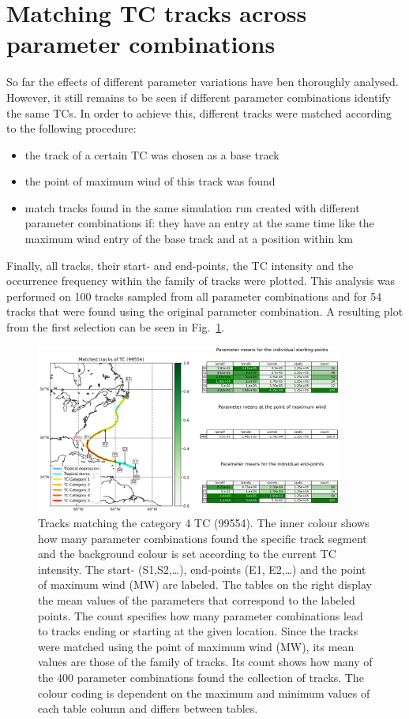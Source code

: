 \section{Matching TC tracks across parameter combinations}
So far the effects of different parameter variations have ben thoroughly analysed. However, it still remains to be seen if different parameter combinations identify the same TCs. In order to achieve this, different tracks were matched according to the following procedure:
\begin{itemize}
  \item the track of a certain TC was chosen as a base track
  \item the point of maximum wind of this track was found
  \item match tracks found in the same simulation run created with different parameter combinations if: they have an entry at the same time like the maximum wind entry of the base track and at a position within \unit[70]{km}
\end{itemize}
Finally, all tracks, their start- and end-points, the TC intensity and the occurrence frequency within the family of tracks were plotted. This analysis was performed on 100 tracks sampled from all parameter combinations and for 54 tracks that were found using the original parameter combination. A resulting plot from the first selection can be seen in Fig.~\ref{fig:matching_plot_cat4}.\newline
\begin{figure}[!htb]
	\centering
	\includegraphics[width=0.9\textwidth]{img/matching_plot_ref_02_tc99554_param_id353_cat4.png}
	\caption{Tracks matching the category 4 TC (99554). The inner colour shows how many parameter combinations found the specific track segment and the background colour is set according to the current TC intensity. The start- (S1,S2,\dots), end-points (E1, E2,\dots) and the point of maximum wind (MW) are labeled.  \newline
	The tables on the right display the mean values of the parameters that correspond to the labeled points. The count specifies how many parameter combinations lead to tracks ending or starting at the given location. Since the tracks were matched using the point of maximum wind (MW), its mean values are those of the family of tracks. Its count shows how many of the 400 parameter combinations found the collection of tracks. The colour coding is dependent on the maximum and minimum values of each table column and differs between tables.}
	\label{fig:matching_plot_cat4}
\end{figure}
